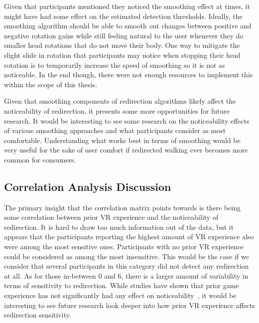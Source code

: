 Given that participants mentioned they noticed the smoothing effect at times, it might have had some effect on the estimated detection thresholds. Ideally, the smoothing algorithm should be able to smooth out changes between positive and negative rotation gains while still feeling natural to the user whenever they do smaller head rotations that do not move their body. One way to mitigate the slight slide in rotation that participants may notice when stopping their head rotation is to temporarily increase the speed of smoothing so it is not as noticeable. In the end though, there were not enough resources to implement this within the scope of this thesis. 

Given that smoothing components of redirection algorithms likely affect the noticeability of redirection, it presents some more opportunities for future research. It would be interesting to see some research on the noticeability effects of various smoothing approaches and what participants consider as most comfortable. Understanding what works best in terms of smoothing would be very useful for the sake of user comfort if redirected walking ever becomes more common for consumers. 

\subsection{Correlation Analysis Discussion}
The primary insight that the correlation matrix points towards is there being some correlation between prior VR experience and the noticeability of redirection. It is hard to draw too much information out of the data, but it appears that the participants reporting the highest amount of VR experience also were among the most sensitive ones. Participants with no prior VR experience could be considered as among the most insensitive. This would be the case if we consider that several participants in this category did not detect any redirection at all. As for those in-between 0 and 6, there is a larger amount of variability in terms of sensitivity to redirection. While studies have shown that prior game experience has not significantly had any effect on noticeability~\cite{nguyen2018individual}, it would be interesting to see future research look deeper into how prior VR experience affects redirection sensitivity.
